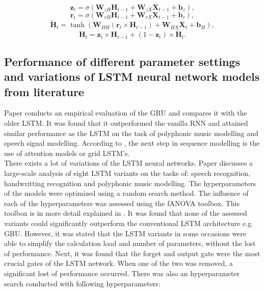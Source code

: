 \begin{equation}
	\textbf{z}_{t} = \sigma(\textbf{W}_{zH}\textbf{H}_{t-1}+\textbf{W}_{zX}\textbf{X}_{t-1}+\textbf{b}_{z}),
\end{equation}
\begin{equation}
	\textbf{r}_{t} = \sigma(\textbf{W}_{rH}\textbf{H}_{t-1}+\textbf{W}_{rX}\textbf{X}_{t-1}+\textbf{b}_{r}),
\end{equation}
\begin{equation}
	\tilde{\textbf{H}}_{t}=\tanh(\textbf{W}_{HH}(\textbf{r}_t\times\textbf{H}_{t-1})+\textbf{W}_{HX}\textbf{X}_t+\textbf{b}_H),
\end{equation}
\begin{equation}
	\textbf{H}_t=\textbf{z}_t\times\textbf{H}_{t-1}+(1-\textbf{z}_t)\times\tilde{\textbf{H}}_t.
\end{equation}

\subsection{Performance of different parameter settings and variations of LSTM neural network models from literature}\label{s:Performance results between different models}
Paper \cite{Chung2014} conducts an empirical evaluation of the GRU and compares it with the older LSTM. It was found that it outperformed the vanilla RNN and attained similar performance as the LSTM on the task of polyphonic music modelling and speech signal modelling. 
According to \cite{Olah}, the next step in sequence modelling is the use of attention models or grid LSTM's.\\

There exists a lot of variations of the LSTM neural networks. Paper \cite{Greff2017} discusses a large-scale analysis of eight LSTM variants on the tasks of: speech recognition, handwritting recognition and polyphonic music modelling. The hyperparameters of the models were optimized using a random search method. The influence of each of the hyperparameters was assessed using the fANOVA toolbox. This toolbox is in more detail explained in \cite{Hutter2014}. It was found that none of the assessed variants could significantly outperform the conventional LSTM architecture e.g. GRU. However, it was stated that the LSTM variants in some occasions were able to simplify the calculation load and number of parameters, without the lost of performance. Next, it was found that the forget and output gate were the most crucial gates of the LSTM network. When one of the two was removed, a significant lost of performance occurred. There was also an hyperparameter search conducted with following hyperparameters:

